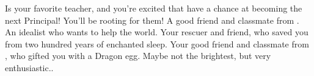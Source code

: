 \documentclass[char]{GL2020}
\begin{document}
\begin{contacts}
	\contact{\cMusic{}} Is your favorite teacher, and you’re excited that \cMusic{\they} have a chance at becoming the next Principal!  You’ll be rooting for them! 
	\contact{\cTechStar{}} A good friend and classmate from \pTech{}. An idealist who wants to help the world.
	\contact{\cWildCard{}} Your rescuer and friend, who saved you from two hundred years of enchanted sleep.
	\contact{\cPirateChild{}} Your good friend and classmate from \pShip{}, who gifted you with a Dragon egg. Maybe not the brightest, but very enthusiastic..
	
\end{contacts}
\end{document}
